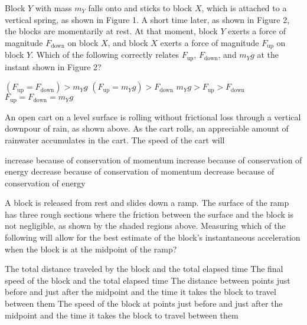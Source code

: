 \documentclass[12pt]{exam}
\newcommand{\pic}[2]{
  \begin{center}
    \texttt{[image: \#2]}
  \end{center}
}
\begin{document}
\begin{questions}
  \uplevel{
    \pic{.27}{falling-blocks}
  }
  \question Block $Y$ with mass $m_Y$ falls onto and sticks to block $X$, which
  is attached to a vertical spring, as shown in Figure 1. A short time later,
  as shown in Figure 2, the blocks are momentarily at rest. At that moment,
  block $Y$ exerts a force of magnitude $F_\text{down}$ on block $X$, and
  block $X$ exerts a force of magnitude $F_\text{up}$ on block $Y$. Which of
  the following correctly relates $F_\text{up}$, $F_\text{down}$, and $m_Yg$ at
  the instant shown in Figure 2?
  \begin{choices}
    \choice$\left(F_\text{up}=F_\text{down}\right)>m_Yg$
    \choice$\left(F_\text{up}=m_Yg\right)>F_\text{down}$
    \choice$m_Yg > F_\text{up} > F_\text{down}$
    \choice$F_\text{up}=F_\text{down}=m_Yg$
  \end{choices}
    
  \uplevel{
    \pic{.35}{downpour}
  }
  \question An open cart on a level surface is rolling without frictional loss
  through a vertical downpour of rain, as shown above. As the cart rolls, an
  appreciable amount of rainwater accumulates in the cart. The speed of the
  cart will
  \begin{choices}
    \choice increase because of conservation of momentum
    \choice increase because of conservation of energy
    \choice decrease because of conservation of momentum
    \choice decrease because of conservation of energy
  \end{choices}
  \newpage
  
  \uplevel{
    \vspace{-.3in}
    \pic{.4}{rough-ramp}
  }
  \question\vspace{-.2in}A block is released from rest and slides down a ramp.
  The surface of the ramp has three rough sections where the friction between
  the surface and the block is not negligible, as shown by the shaded regions
  above. Measuring which of the following will allow for the best estimate of
  the block's instantaneous acceleration when the block is at the midpoint of
  the ramp?
  \begin{choices}
    \choice The total distance traveled by the block and the total elapsed time
    \choice The final speed of the block and the total elapsed time
    \choice The distance between points just before and just after the midpoint
    and the time it takes the block to travel between them
    \choice The speed of the block at points just before and just after the
    midpoint and the time it takes the block to travel between them
  \end{choices}
    

\end{questions}
\end{document}
